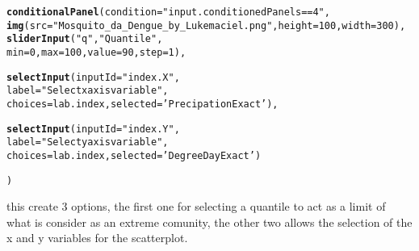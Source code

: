 \documentclass{article}\usepackage[]{graphicx}\usepackage[]{color}
\makeatletter
\newcommand{\hlnum}[1]{\textcolor[rgb]{0.686,0.059,0.569}{#1}}%
\newcommand{\hlstr}[1]{\textcolor[rgb]{0.192,0.494,0.8}{#1}}%
\newcommand{\hlstd}[1]{\textcolor[rgb]{0.345,0.345,0.345}{#1}}%
\newcommand{\hlkwc}[1]{\textcolor[rgb]{0.333,0.667,0.333}{#1}}%
\newcommand{\hlkwd}[1]{\textcolor[rgb]{0.737,0.353,0.396}{\textbf{#1}}}%
\newenvironment{kframe}{%
 \def\at@end@of@kframe{}%
 \ifinner\ifhmode%
  \def\at@end@of@kframe{\end{minipage}}%
  \begin{minipage}{\columnwidth}%
 \fi\fi%
 \def\FrameCommand##1{\hskip\@totalleftmargin \hskip-\fboxsep
 \colorbox{shadecolor}{##1}\hskip-\fboxsep
     \hskip-\linewidth \hskip-\@totalleftmargin \hskip\columnwidth}%
 \MakeFramed {\advance\hsize-\width
   \@totalleftmargin\z@ \linewidth\hsize
   \@setminipage}}%
 {\par\unskip\endMakeFramed%
 \at@end@of@kframe}
\newenvironment{knitrout}{}{} %
\makeatother
\begin{document}
\begin{knitrout}
\color{fgcolor}\begin{kframe}
\begin{alltt}
          \hlkwd{conditionalPanel}\hlstd{(}\hlkwc{condition}\hlstd{=}\hlstr{"input.conditionedPanels==4"}\hlstd{,}
                           \hlkwd{img}\hlstd{(}\hlkwc{src}\hlstd{=}\hlstr{"Mosquito_da_Dengue_by_Lukemaciel.png"}\hlstd{,} \hlkwc{height} \hlstd{=} \hlnum{100}\hlstd{,} \hlkwc{width} \hlstd{=} \hlnum{300}\hlstd{),}
                           \hlkwd{sliderInput}\hlstd{(}\hlstr{"q"}\hlstd{,} \hlstr{"Quantile"}\hlstd{,}
                                       \hlkwc{min}\hlstd{=}\hlnum{0}\hlstd{,} \hlkwc{max}\hlstd{=}\hlnum{100}\hlstd{,} \hlkwc{value}\hlstd{=}\hlnum{90}\hlstd{,}\hlkwc{step}\hlstd{=}\hlnum{1}\hlstd{),}

                           \hlkwd{selectInput}\hlstd{(}\hlkwc{inputId} \hlstd{=} \hlstr{"index.X"}\hlstd{,}
                                      \hlkwc{label} \hlstd{=} \hlstr{"Select x axis variable"}\hlstd{,}
                                      \hlkwc{choices} \hlstd{= lab.index,}\hlkwc{selected}\hlstd{=}\hlstr{'PrecipationExact'}\hlstd{),}

                          \hlkwd{selectInput}\hlstd{(}\hlkwc{inputId} \hlstd{=} \hlstr{"index.Y"}\hlstd{,}
                                        \hlkwc{label} \hlstd{=} \hlstr{"Select y axis variable"}\hlstd{,}
                                        \hlkwc{choices} \hlstd{= lab.index,}\hlkwc{selected}\hlstd{=}\hlstr{'DegreeDayExact'}\hlstd{)}

           \hlstd{)}
\end{alltt}
\end{kframe}
\end{knitrout}


this create 3 options, the first one for selecting a quantile to act as a limit of what is consider as an extreme comunity, the other two allows the selection of the x and y variables for the scatterplot. 
\end{document}
